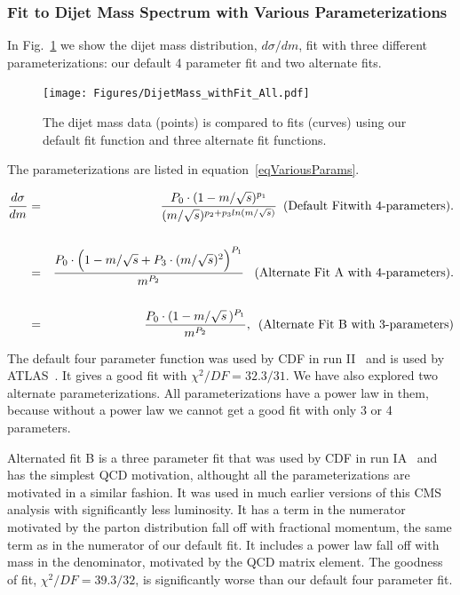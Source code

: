 \subsubsection{Fit to Dijet Mass Spectrum with Various Parameterizations}
\label{sectionParam}

 
In Fig.~\ref{dijetmassFitParams} we show the dijet mass distribution,
$d\sigma/dm$, fit with three different parameterizations:  our default 4 parameter
fit and two alternate fits.
\begin{figure}[!ht]
  \begin{center}
        \texttt{[image: Figures/DijetMass\_withFit\_All.pdf]}
    \caption{ 
The dijet mass data (points) is compared to fits (curves)
using our default fit function and three alternate fit functions.}
    \label{dijetmassFitParams}
  \end{center}
\end{figure}

\clearpage
The parameterizations are listed in equation~\ref{eqVariousParams}.

\begin{eqnarray}
{\frac{d\sigma}{dm}} 
 &=& {\frac{P_{0} \cdot (1 - m/\sqrt{s})^{p_{1}}}{(m/\sqrt{s})^{p_{2} + p_{3} ln(m/\sqrt{s})}}} \, \, \, \mbox{(Default Fitwith 4-parameters)}. \cr
 & & \cr
 &=& {\frac{P_{0} \cdot {\Big(1-m/\sqrt{s}+P_3\cdot(m/\sqrt{s})^2\Big)^{P_1}}}{m^{P_{2}}}} \, \, \,\mbox{ (Alternate Fit A with 4-parameters)}. \cr
 & & \cr
 &=& {\frac{P_{0} \cdot {(1-m/\sqrt{s}\,)^{P_1}} }{m^{P_{2}}}}, \, \, \, \mbox{(Alternate Fit B with 3-parameters)} \cr
\label{eqVariousParams}
\end{eqnarray}


The default four parameter function was used by CDF in run II~\cite{Aaltonen:2008dn} and is used 
by ATLAS~\cite{ATLAS_Search}. It gives a good fit with $\chi^2/DF=32.3/31$.
We have also explored two alternate parameterizations.  All parameterizations have a power law in them, because without
a power law we cannot get a good fit with only 3 or 4 parameters. 

Alternated fit B is a three parameter fit that was used by CDF in run IA~\cite{Abe:1995jz} and has the simplest QCD motivation,
althought all the parameterizations are motivated in a similar fashion.  It was used in much earlier versions of this CMS analysis
with significantly less luminosity.
It has a term in the numerator motivated by the parton distribution fall off
with fractional momentum, the same term as in the numerator of our default fit.
It includes a power law fall off with mass in the denominator, 
motivated by the QCD matrix element. The goodness of fit, $\chi^2/DF=39.3/32$, is significantly
worse than our default four parameter fit.

